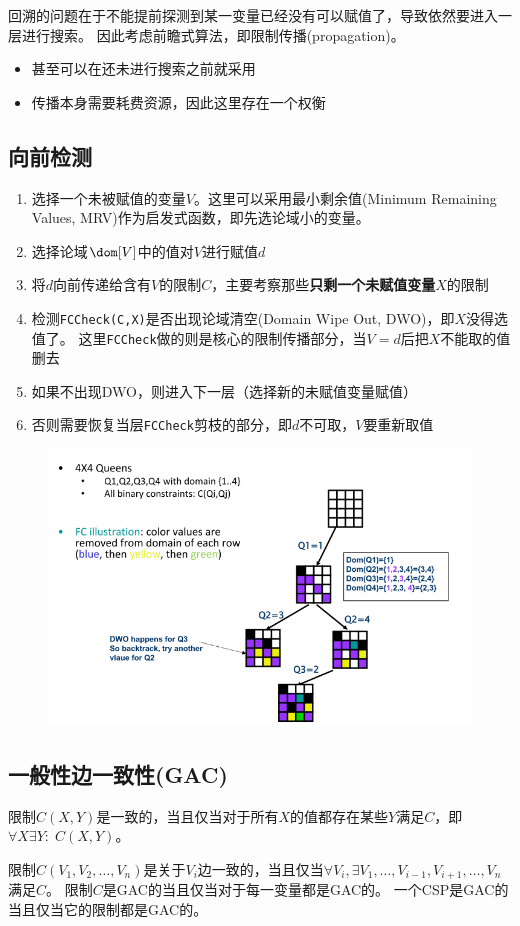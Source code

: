 回溯的问题在于不能提前探测到某一变量已经没有可以赋值了，导致依然要进入一层进行搜索。
因此考虑前瞻式算法，即限制传播(propagation)。
\begin{itemize}
	\item 甚至可以在还未进行搜索之前就采用
	\item 传播本身需要耗费资源，因此这里存在一个权衡
\end{itemize}

\subsection{向前检测}
\begin{enumerate}
	\item 选择一个未被赋值的变量$V$。这里可以采用最小剩余值(Minimum Remaining Values, MRV)作为启发式函数，即先选论域小的变量。
	\item 选择论域$\dom[V]$中的值对$V$进行赋值$d$
	\item 将$d$向前传递给含有$V$的限制$C$，主要考察那些\textbf{只剩一个未赋值变量$X$}的限制
	\item 检测\verb'FCCheck(C,X)'是否出现论域清空(Domain Wipe Out, DWO)，即$X$没得选值了。
	这里\verb'FCCheck'做的则是核心的限制传播部分，当$V=d$后把$X$不能取的值删去
	\item 如果不出现DWO，则进入下一层（选择新的未赋值变量赋值）
	\item 否则需要恢复当层\verb'FCCheck'剪枝的部分，即$d$不可取，$V$要重新取值
\end{enumerate}
\begin{figure}[H]
\centering
\includegraphics[width=0.6\linewidth]{fig/forward_checking_eg.png}
\end{figure}

\subsection{一般性边一致性(GAC)}
\begin{definition}[一致]
限制$C(X,Y)$是一致的，当且仅当对于所有$X$的值都存在某些$Y$满足$C$，即$\forall X\exists Y:\;C(X,Y)$。
\end{definition}
\begin{definition}
限制$C(V_1,V_2,\ldots,V_n)$是关于$V_i$边一致的，当且仅当$\forall V_i,\exists V_1,\ldots,V_{i-1},V_{i+1},\ldots,V_n$满足$C$。
限制$C$是GAC的当且仅当对于每一变量都是GAC的。
一个CSP是GAC的当且仅当它的限制都是GAC的。
\end{definition}

